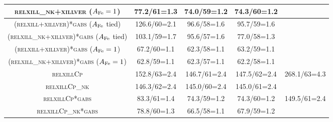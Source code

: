 \documentclass[11pt,a4paper,pdftex]{article}
\begin{document}
\begin{table*}
\begin{center}
{{\begin{tabular}{ccccc}
\textsc{relxill\_nk+xillver} ($A_{\rm Fe}=1$) & 77.2/61=1.3 & 74.0/59=1.2 & 74.3/60=1.2 &  \\
\hline
\textsc{(relxill+xillver)*gabs} ($A_{\rm Fe}$ tied)& 126.6/60=2.1 & 96.6/58=1.6& 95.7/59=1.6 & \\
\textsc{(relxill\_nk+xillver)*gabs} ($A_{\rm Fe}$ tied) & 103.1/59=1.7 & 95.6/57=1.6 & 77.0/58=1.3 &  \\
\textsc{(relxill+xillver)*gabs} ($A_{\rm Fe}=1$)& 67.2/60=1.1 & 62.3/58=1.1& 63.2/59=1.1 & \\
\textsc{(relxill\_nk+xillver)*gabs} ($A_{\rm Fe}=1$) & 62.8/59=1.1 & 62.3/57=1.1 & 62.2/58=1.1 &  \\
\hline
\textsc{relxillCp} & 152.8/63=2.4 & 146.7/61=2.4& 147.5/62=2.4 & 268.1/63=4.3 \\
\textsc{relxillCp\_nk} & 146.3/62=2.4 & 145.0/60=2.4 & 145.0/61=2.4 &  \\
\textsc{relxillCp*gabs} & 83.3/61=1.4 & 74.3/59=1.2& 74.3/60=1.2 & 149.5/61=2.4 \\
\textsc{relxillCp\_nk*gabs} & 78.8/60=1.3 & 66.5/58=1.1 & 67.9/59=1.2 &  \\
\hline 
\end{tabular}}
}
\end{center}
\end{table*}
\end{document}
